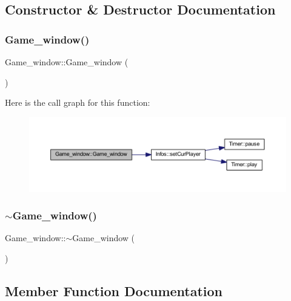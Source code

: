 \subsection{Constructor \& Destructor Documentation}
\mbox{\label{class_game__window_a1d0ac99e8c117a5016883b52446c6530}} 
\subsubsection{\texorpdfstring{Game\+\_\+window()}{Game\_window()}}
{\footnotesize\ttfamily Game\+\_\+window\+::\+Game\+\_\+window (\begin{DoxyParamCaption}{ }\end{DoxyParamCaption})}

Here is the call graph for this function\+:
\nopagebreak
\begin{figure}[H]
\begin{center}
\leavevmode
\includegraphics[width=350pt]{class_game__window_a1d0ac99e8c117a5016883b52446c6530_cgraph}
\end{center}
\end{figure}
\mbox{\label{class_game__window_a5e84f0f55c4526bb0ea3a592c439c16f}} 
\subsubsection{\texorpdfstring{$\sim$\+Game\+\_\+window()}{~Game\_window()}}
{\footnotesize\ttfamily Game\+\_\+window\+::$\sim$\+Game\+\_\+window (\begin{DoxyParamCaption}{ }\end{DoxyParamCaption})}



\subsection{Member Function Documentation}
\mbox{\label{class_game__window_afa942088809bf10731bb31d0d37b878d}} 
